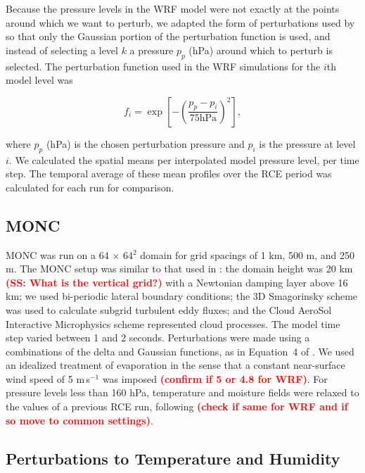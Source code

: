 \documentclass[draft]{agujournal2019}
\newcommand{\todo}[1]{\textcolor{red}{\textbf{(#1)}}}
\begin{document}
Because the pressure levels in the WRF model were not exactly at the points
around which we want to perturb, we adapted the form of perturbations used by
 so that only the Gaussian portion of the perturbation
function is used, and instead of selecting a level $k$ a pressure $p_p$ (hPa)
around which to perturb is selected. The perturbation function used in the WRF
simulations for the $i$th model level was

$$
f_i = \exp\left[ - \left( \frac{p_p - p_i}{75 \textrm{hPa}}\right)^2 \right],
$$

\noindent where $p_p$ (hPa) is the chosen perturbation pressure and $p_i$ is the
pressure at level $i$. We calculated the spatial means per interpolated model
pressure level, per time step. The temporal average of these mean profiles over
the RCE period was calculated for each run for comparison.

\subsection{MONC}

MONC was run on a 64 $\times$ 64$^2$ domain for grid spacings of 1 km, 500 m,
and 250 m. The MONC setup was similar to that used in :
the domain height was 20 km \todo{SS: What is the vertical grid?} with a Newtonian damping layer above 16 km; we used
bi-periodic lateral boundary conditions; the 3D Smagorinsky scheme was used to
calculate subgrid turbulent eddy fluxes; and the Cloud AeroSol Interactive
Microphysics \cite<CASIM, see>[and references therein for previous
uses]{Daleu_QJRMS_2023} scheme represented cloud processes. The model time step
varied between 1 and 2 seconds. Perturbations were made using a combinations of
the delta and Gaussian functions, as in Equation~4 of .
We used an idealized treatment of evaporation in the sense that a constant
near-surface wind speed of 5 m\,s$^{-1}$ was imposed \todo{confirm if 5 or 4.8
for WRF}. For pressure levels less than 160 hPa, temperature and moisture fields
were relaxed to the values of a previous RCE run, following
\cite{Herman_JAMES_2013} \todo{check if same for WRF and if so move to common
settings}.

\subsection{Perturbations to Temperature and Humidity}
\end{document}
